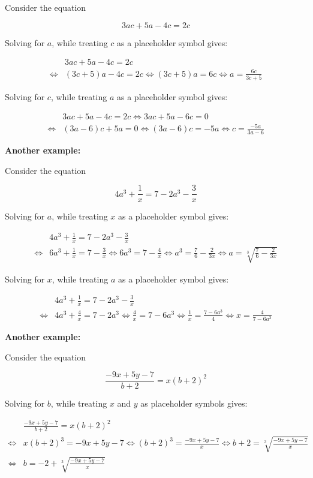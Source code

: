 \documentclass{article}
\begin{document}
Consider the equation 

\[3ac + 5a - 4c = 2c\]

Solving for \(a\), while treating \(c\) as a placeholder symbol gives:

\begin{align*}
& 3ac + 5a - 4c = 2c \\
\iff & (3c + 5)a - 4c = 2c 
\iff (3c + 5)a = 6c 
\iff a = \frac{6c}{3c + 5}
\end{align*}

Solving for \(c\), while treating \(a\) as a placeholder symbol gives:

\begin{align*}
& 3ac + 5a - 4c = 2c 
\iff 3ac + 5a - 6c = 0 \\
\iff & (3a - 6)c + 5a = 0 
\iff (3a - 6)c = -5a 
\iff c = \frac{-5a}{3a - 6}
\end{align*}



\textbf{Another example:}

Consider the equation

\[4a^3 + \frac{1}{x} = 7 - 2a^3 - \frac{3}{x}\]

Solving for \(a\), while treating \(x\) as a placeholder symbol gives:

\begin{align*}
& 4a^3 + \frac{1}{x} = 7 - 2a^3 - \frac{3}{x} \\
\iff & 6a^3 + \frac{1}{x} = 7 - \frac{3}{x} 
\iff 6a^3 = 7 - \frac{4}{x} 
\iff a^3 = \frac{7}{6} - \frac{2}{3x} 
\iff a = \sqrt[3]{\frac{7}{6} - \frac{2}{3x}}
\end{align*}

Solving for \(x\), while treating \(a\) as a placeholder symbol gives:

\begin{align*}
& 4a^3 + \frac{1}{x} = 7 - 2a^3 - \frac{3}{x} \\
\iff & 4a^3 + \frac{4}{x} = 7 - 2a^3 
\iff \frac{4}{x} = 7 - 6a^3 
\iff \frac{1}{x} = \frac{7 - 6a^3}{4} 
\iff x = \frac{4}{7 - 6a^3}
\end{align*}



\textbf{Another example:}

Consider the equation

\[\frac{-9x + 5y - 7}{b + 2} = x(b + 2)^2\]

Solving for \(b\), while treating \(x\) and \(y\) as placeholder symbols gives:

\begin{align*}
& \frac{-9x + 5y - 7}{b + 2} = x(b + 2)^2 \\
\iff & x(b + 2)^3 = -9x + 5y - 7 
\iff (b + 2)^3 = \frac{-9x + 5y - 7}{x} 
\iff b + 2 = \sqrt[3]{\frac{-9x + 5y - 7}{x}} \\
\iff & b = -2 + \sqrt[3]{\frac{-9x + 5y - 7}{x}} 
\end{align*}
\end{document}
